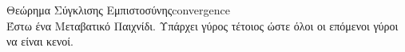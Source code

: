 {}
\begin{theoremgr}{Θεώρημα Σύγκλισης Εμπιστοσύνης}{convergence} \ \\
  Έστω ένα Μεταβατικό Παιχνίδι. Υπάρχει γύρος τέτοιος ώστε όλοι οι επόμενοι γύροι να είναι κενοί.
\end{theoremgr}
